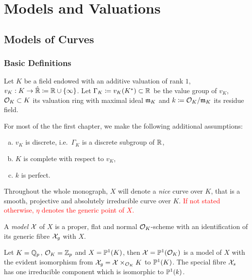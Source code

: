 

\chapter{Models and Valuations}\label{ch:models-and-valuations}

\section{Models of Curves}\label{sec:models-of-curves}

\subsection{Basic Definitions}\label{subsec:basic-definitions}
Let $K$ be a field endowed with an additive valuation of rank $1$, $v_K: K \to \hat{\mathbb R} \coloneqq \mathbb R\cup \lbrace\infty\rbrace$.
Let $\Gamma_K \coloneqq v_K(K^*) \subset \mathbb R$ be the value group of $v_K$, $\mathcal O_K \subset K$ its valuation ring with
maximal ideal $\mathfrak m_K$ and $k \coloneqq \mathcal O_K /\mathfrak m_K$ its residue field.

For most of the the first chapter, we make the following additional assumptions:
\begin{assumption} \label{ass:v_K}
    \begin{enumerate}[(a)]
        \item $v_K$ is discrete, i.e.\ $\Gamma_K$ is a discrete subgroup of $\mathbb R$,
        \item $K$ is complete with respect to $v_K$,
        \item $k$ is perfect.
    \end{enumerate}
\end{assumption}

Throughout the whole monograph, $X$ will denote a \textit{nice} curve over $K$,
that is a smooth, projective and absolutely irreducible curve over $K$.
\textcolor{red}{If not stated otherwise, $\eta$ denotes the generic point of $X$.}

\begin{definition} \label{def:model}
    A \textit{model} $\mathcal X$ of $X$ is a proper, flat and normal $\mathcal O_K $-scheme
    with an identification of its generic fibre $\mathcal X_g$ with $X$.
\end{definition}

\begin{example}
    Let $K = \mathbb Q_p$, $\mathcal O_K  = \mathbb Z_p$ and $X = \mathbb P^1(K)$, then $\mathcal X = \mathbb P^1(\mathcal O_K )$ is a model of $X$ with the
    evident isomorphism from $\mathcal X_g = \mathcal X \times_{\mathcal O_K} K$ to $\mathbb P^1(K)$.
    The special fibre $\mathcal X_s$ has one irreducible component which is isomorphic to $\mathbb P^1(k)$.
\end{example}


